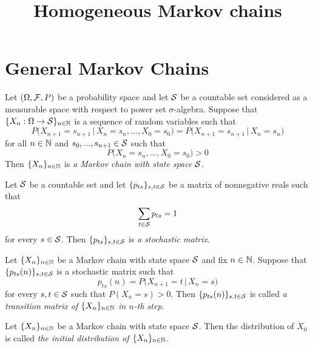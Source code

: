 


\title{Homogeneous Markov chains}
\date{}
\maketitle

\section{General Markov Chains}

\begin{definition}
Let $(\Omega, {\mathcal F}, P)$ be a probability space and let ${\mathcal S}$ be a countable set considered as a measurable space with respect to power set $\sigma$-algebra. Suppose that $\{X_n:\Omega\rightarrow {\mathcal S}\}_{n\in {\mathbb N}}$ is a sequence of random variables such that
$$P\big(X_{n+1} = s_{n+1}\,\big|\,X_n=s_n,...,X_0=s_0\big) = P\big(X_{n+1}=s_{n+1}\,\big|\,X_n=s_n\big)$$
for all $n\in {\mathbb N}$ and $s_0,...,s_{n+1}\in {\mathcal S}$ such that 
$$P\big(X_n=s_n,...,X_0=s_0\big) > 0$$
Then $\{X_n\}_{n\in {\mathbb N}}$ is \textit{a Markov chain with state space ${\mathcal S}$}.
\end{definition}

\begin{definition}
Let ${\mathcal S}$ be a countable set and let $\{p_{ts}\}_{s,t \in {\mathcal S}}$ be a matrix of nonnegative reals such that
$$\sum_{t\in {\mathcal S}}p_{ts} = 1$$
for every $s\in {\mathcal S}$. Then $\{p_{ts}\}_{s,t\in {\mathcal S}}$ is \textit{a stochastic matrix}.
\end{definition}

\begin{definition}
Let $\{X_n\}_{n\in {\mathbb N}}$ be a Markov chain with state space ${\mathcal S}$ and fix $n\in {\mathbb N}$. Suppose that $\{p_{ts}(n)\}_{s,t\in {\mathcal S}}$ is a stochastic matrix such that
$$p_{ts}(n) = P\big(X_{n+1}=t\,\big|\,X_n=s\big)$$
for every $s,t\in {\mathcal S}$ such that $P(X_n=s)>0$. Then $\{p_{ts}(n)\}_{s,t\in {\mathcal S}}$ is called \textit{a transition matrix of $\{X_n\}_{n\in {\mathbb N}}$ in $n$-th step}.
\end{definition}

\begin{definition}
Let $\{X_n\}_{n\in {\mathbb N}}$ be a Markov chain with state space ${\mathcal S}$. Then the distribution of $X_0$ is called \textit{the initial distribution of $\{X_n\}_{n\in {\mathbb N}}$}.
\end{definition}

